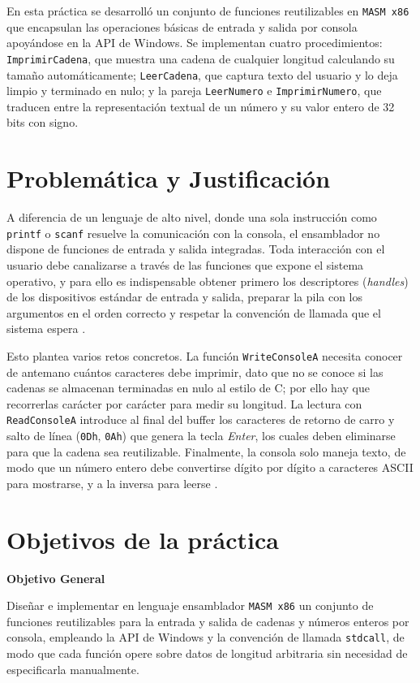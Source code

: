 \documentclass[a4paper,12pt]{article}
\begin{document}
En esta práctica se desarrolló un conjunto de funciones reutilizables en \texttt{MASM x86} que encapsulan las operaciones básicas de entrada y salida por consola apoyándose en la API de Windows. Se implementan cuatro procedimientos: \texttt{ImprimirCadena}, que muestra una cadena de cualquier longitud calculando su tamaño automáticamente; \texttt{LeerCadena}, que captura texto del usuario y lo deja limpio y terminado en nulo; y la pareja \texttt{LeerNumero} e \texttt{ImprimirNumero}, que traducen entre la representación textual de un número y su valor entero de 32 bits con signo.

\section{Problemática y Justificación}
A diferencia de un lenguaje de alto nivel, donde una sola instrucción como \texttt{printf} o \texttt{scanf} resuelve la comunicación con la consola, el ensamblador no dispone de funciones de entrada y salida integradas. Toda interacción con el usuario debe canalizarse a través de las funciones que expone el sistema operativo, y para ello es indispensable obtener primero los descriptores (\textit{handles}) de los dispositivos estándar de entrada y salida, preparar la pila con los argumentos en el orden correcto y respetar la convención de llamada que el sistema espera \cite{irvine2020assembly}.

Esto plantea varios retos concretos. La función \texttt{WriteConsoleA} necesita conocer de antemano cuántos caracteres debe imprimir, dato que no se conoce si las cadenas se almacenan terminadas en nulo al estilo de C; por ello hay que recorrerlas carácter por carácter para medir su longitud. La lectura con \texttt{ReadConsoleA} introduce al final del buffer los caracteres de retorno de carro y salto de línea (\texttt{0Dh}, \texttt{0Ah}) que genera la tecla \textit{Enter}, los cuales deben eliminarse para que la cadena sea reutilizable. Finalmente, la consola solo maneja texto, de modo que un número entero debe convertirse dígito por dígito a caracteres ASCII para mostrarse, y a la inversa para leerse \cite{stallings2019computer}.

\newpage
\section{Objetivos de la práctica}
\textbf{Objetivo General}

Diseñar e implementar en lenguaje ensamblador \texttt{MASM x86} un conjunto de funciones reutilizables para la entrada y salida de cadenas y números enteros por consola, empleando la API de Windows y la convención de llamada \texttt{stdcall}, de modo que cada función opere sobre datos de longitud arbitraria sin necesidad de especificarla manualmente.
\end{document}
